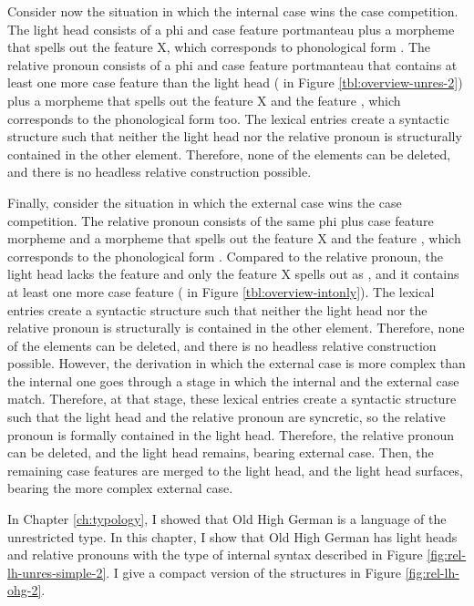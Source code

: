 Consider now the situation in which the internal case wins the case competition. The light head consists of a phi and case feature portmanteau plus a morpheme that spells out the feature X, which corresponds to phonological form . The relative pronoun consists of a phi and case feature portmanteau that contains at least one more case feature than the light head ( in Figure \ref{tbl:overview-unres-2}) plus a morpheme that spells out the feature X and the feature , which corresponds to the phonological form  too.
The lexical entries create a syntactic structure such that neither the light head nor the relative pronoun is structurally contained in the other element. Therefore, none of the elements can be deleted, and there is no headless relative construction possible.

Finally, consider the situation in which the external case wins the case competition. The relative pronoun consists of the same phi plus case feature morpheme and a morpheme that spells out the feature X and the feature , which corresponds to the phonological form . Compared to the relative pronoun, the light head lacks the feature  and only the feature X spells out as , and it contains at least one more case feature ( in Figure \ref{tbl:overview-intonly}). The lexical entries create a syntactic structure such that neither the light head nor the relative pronoun is structurally is contained in the other element. Therefore, none of the elements can be deleted, and there is no headless relative construction possible.
However, the derivation in which the external case is more complex than the internal one goes through a stage in which the internal and the external case match. Therefore, at that stage, these lexical entries create a syntactic structure such that the light head and the relative pronoun are syncretic, so the relative pronoun is formally contained in the light head. Therefore, the relative pronoun can be deleted, and the light head remains, bearing external case. Then, the remaining case features are merged to the light head, and the light head surfaces, bearing the more complex external case.

In Chapter \ref{ch:typology}, I showed that Old High German is a language of the unrestricted type. In this chapter, I show that Old High German has light heads and relative pronouns with the type of internal syntax described in Figure \ref{fig:rel-lh-unres-simple-2}. I give a compact version of the structures in Figure \ref{fig:rel-lh-ohg-2}.

